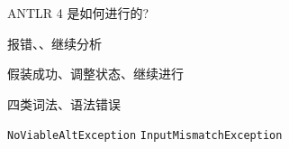 
\begin{frame}{}
  \begin{center}
    \Large{ANTLR 4 是如何进行的?}
  \end{center}
\end{frame}

\begin{frame}{}
  \begin{center}

    \vspace{0.20cm}
    报错、、继续分析
  \end{center}
\end{frame}

\begin{frame}{}

  \vspace{0.30cm}
  \begin{center}
     假装成功、调整状态、继续进行
  \end{center}
\end{frame}

\begin{frame}{}
\end{frame}

\begin{frame}{}
  \begin{center}
    四类词法、语法错误 \\[8pt]


    \texttt{NoViableAltException} \qquad \texttt{InputMismatchException}
  \end{center}
\end{frame}

\begin{frame}{}
  \begin{center}
    \texttt{\bf {}} \\[20pt]
  \end{center}
\end{frame}

